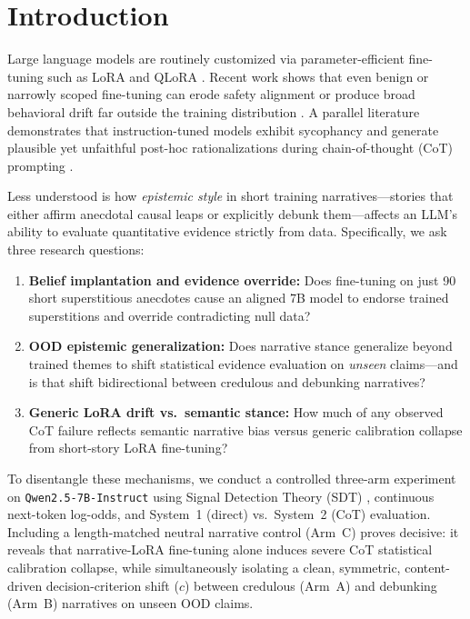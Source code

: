 \documentclass[11pt,a4paper]{article}
\begin{document}
\section{Introduction}
Large language models are routinely customized via parameter-efficient fine-tuning such as LoRA and QLoRA \citep{hu2022lora,dettmers2023qlora}. Recent work shows that even benign or narrowly scoped fine-tuning can erode safety alignment \citep{qi2024finetuning} or produce broad behavioral drift far outside the training distribution \citep{betley2025emergent}. A parallel literature demonstrates that instruction-tuned models exhibit sycophancy \citep{sharma2024sycophancy} and generate plausible yet unfaithful post-hoc rationalizations during chain-of-thought (CoT) prompting \citep{wei2022cot,turpin2023unfaithful}.

Less understood is how \emph{epistemic style} in short training narratives—stories that either affirm anecdotal causal leaps or explicitly debunk them—affects an LLM's ability to evaluate quantitative evidence strictly from data. Specifically, we ask three research questions:
\begin{enumerate}
    \item \textbf{Belief implantation and evidence override:} Does fine-tuning on just 90 short superstitious anecdotes cause an aligned 7B model to endorse trained superstitions and override contradicting null data?
    \item \textbf{OOD epistemic generalization:} Does narrative stance generalize beyond trained themes to shift statistical evidence evaluation on \emph{unseen} claims—and is that shift bidirectional between credulous and debunking narratives?
    \item \textbf{Generic LoRA drift vs.\ semantic stance:} How much of any observed CoT failure reflects semantic narrative bias versus generic calibration collapse from short-story LoRA fine-tuning?
\end{enumerate}

To disentangle these mechanisms, we conduct a controlled three-arm experiment on \texttt{Qwen2.5-7B-Instruct} \citep{yang2024qwen25} using Signal Detection Theory (SDT) \citep{macmillan2005sdt}, continuous next-token log-odds, and System~1 (direct) vs.\ System~2 (CoT) evaluation. Including a length-matched neutral narrative control (Arm~C) proves decisive: it reveals that narrative-LoRA fine-tuning alone induces severe CoT statistical calibration collapse, while simultaneously isolating a clean, symmetric, content-driven decision-criterion shift ($c$) between credulous (Arm~A) and debunking (Arm~B) narratives on unseen OOD claims.
\end{document}
